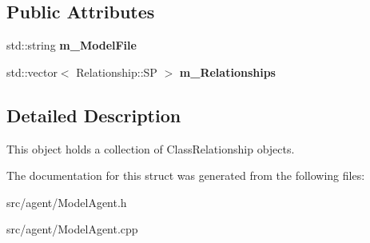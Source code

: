 \subsection*{Public Attributes}
\begin{DoxyCompactItemize}
\item 
\mbox{\label{struct_model_agent_1_1_model_a4c930d35a708cd7bf32c8bdaf19a1705}} 
std\+::string {\bfseries m\+\_\+\+Model\+File}
\item 
\mbox{\label{struct_model_agent_1_1_model_ab0f8ef9e58ab5d6cc990471a8031b2f7}} 
std\+::vector$<$ Relationship\+::\+SP $>$ {\bfseries m\+\_\+\+Relationships}
\end{DoxyCompactItemize}


\subsection{Detailed Description}
This object holds a collection of Class\+Relationship objects. 

The documentation for this struct was generated from the following files\+:\begin{DoxyCompactItemize}
\item 
src/agent/Model\+Agent.\+h\item 
src/agent/Model\+Agent.\+cpp\end{DoxyCompactItemize}
